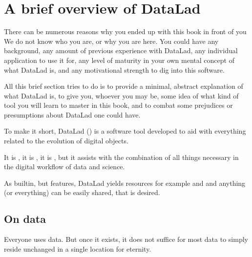 \chapter{A brief overview of DataLad}
\label{\detokenize{intro/philosophy:a-brief-overview-of-datalad}}\label{\detokenize{intro/philosophy:philo}}\label{\detokenize{intro/philosophy::doc}}

\sphinxAtStartPar
There can be numerous reasons why you ended up with this book in front of
you \textendash{} We do not know who you are, or why you are here.
You could have any background, any amount of previous experience with
DataLad, any individual application to use it for,
any level of maturity in your own mental concept of what DataLad
is, and any motivational strength to dig into this software.

\sphinxAtStartPar
All this brief section tries to do is to provide a minimal, abstract explanation
of what DataLad is, to give you, whoever you may be, some idea of what kind of
tool you will learn to master in this book, and to combat some prejudices
or presumptions about DataLad one could have.

\sphinxAtStartPar
To make it short, DataLad () is a software tool developed to aid with everything
related to the evolution of digital objects.

\sphinxAtStartPar
It is , it is
, it is
,
but it assists with the combination of all things
necessary in the digital workflow of data and science.

\sphinxAtStartPar
As built\sphinxhyphen{}in, but  features, DataLad yields  resources \textendash{} for example
{\hyperref[\detokenize{glossary:term-metadata}]{}} and {\hyperref[\detokenize{glossary:term-provenance}]{}} \textemdash{} and anything (or everything)
can be easily shared,  that is desired.


\section{On data}
\label{\detokenize{intro/philosophy:on-data}}
\sphinxAtStartPar
Everyone uses data. But once it exists, it does not suffice for most data
to simply reside unchanged in a single location for eternity.

